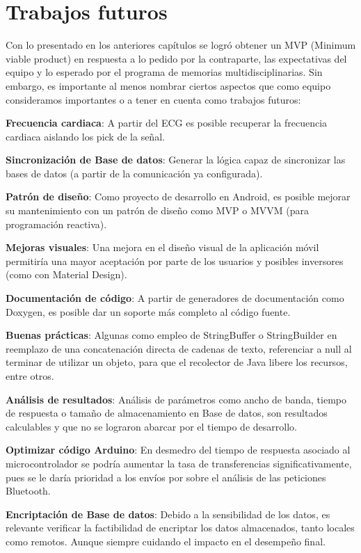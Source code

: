 \section{Trabajos futuros}

Con lo presentado en los anteriores capítulos se logró obtener un MVP (Minimum viable product) en respuesta a lo pedido por la contraparte, las expectativas del equipo y lo esperado por el programa de memorias multidisciplinarias. Sin embargo, es importante al menos nombrar ciertos aspectos que como equipo consideramos importantes o a tener en cuenta como trabajos futuros:

\textbf{Frecuencia cardiaca}: A partir del ECG es posible recuperar la frecuencia cardiaca aislando los pick de la señal.

\textbf{Sincronización de Base de datos}: Generar la lógica capaz de sincronizar las bases de datos (a partir de la comunicación ya configurada).

\textbf{Patrón de diseño}: Como proyecto de desarrollo en Android, es posible mejorar su mantenimiento con un patrón de diseño como MVP o MVVM (para programación reactiva).

\textbf{Mejoras visuales}: Una mejora en el diseño visual de la aplicación móvil permitiría una mayor aceptación por parte de los usuarios y posibles inversores (como con Material Design).

\textbf{Documentación de código}: A partir de generadores de documentación como Doxygen, es posible dar un soporte más completo al código fuente.

\textbf{Buenas prácticas}: Algunas como empleo de StringBuffer o StringBuilder en reemplazo de una concatenación directa de cadenas de texto, referenciar a null al terminar de utilizar un objeto, para que el recolector de Java libere los recursos, entre otros.

\textbf{Análisis de resultados}: Análisis de parámetros como ancho de banda, tiempo de respuesta o tamaño de almacenamiento en Base de datos, son resultados calculables y que no se lograron abarcar por el tiempo de desarrollo.

\textbf{Optimizar código Arduino}: En desmedro del tiempo de respuesta asociado al microcontrolador se podría aumentar la tasa de transferencias significativamente, pues se le daría prioridad a los envíos por sobre el análisis de las peticiones Bluetooth.

\textbf{Encriptación de Base de datos}: Debido a la sensibilidad de los datos, es relevante verificar la factibilidad de encriptar los datos almacenados, tanto locales como remotos. Aunque siempre cuidando el impacto en el desempeño final.

